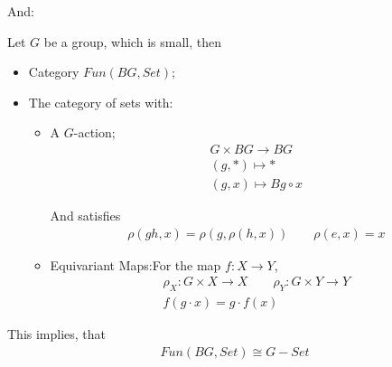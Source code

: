 \documentclass[Total.tex]{subfiles}
\begin{document}
				And:
				\begin{proposition}
					Let $G$ be a group, which is small, then
					\begin{itemize}
						\item Category $Fun(BG,Set)$;
						\item The category of sets with:
						\begin{itemize}
							\item A $G$-action;
							\begin{gather*}
								G\times BG\rightarrow BG\\
								(g,*)\mapsto *\\
								(g,x)\mapsto Bg\circ x
							\end{gather*}
							
							And satisfies
							\begin{gather*}
								\rho(gh,x)=\rho(g,\rho(h,x))\qquad \rho(e,x)=x
							\end{gather*}
							\item Equivariant Maps:For the map $f:X\rightarrow Y$,
							\begin{gather*}
								\rho_X:G\times X\rightarrow X\qquad \rho_Y:G\times Y\rightarrow Y\\
								f(g\cdot x)=g\cdot f(x)
							\end{gather*}
						\end{itemize}
					\end{itemize}
					
					This implies, that 
					\begin{gather*}
						Fun(BG,Set)\cong G-Set
					\end{gather*}
				\end{proposition}
\end{document}
